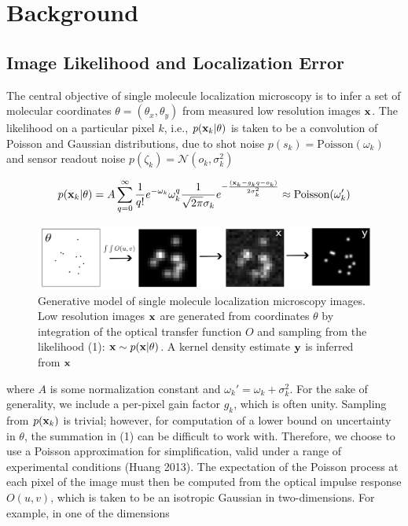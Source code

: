 \documentclass{article}
\begin{document}
\section{Background}

\subsection{Image Likelihood and Localization Error}

The central objective of single molecule localization microscopy is to infer a set of molecular coordinates $\theta=(\theta_{x},\theta_{y})$ from measured low resolution images $\bold{x}$. The likelihood on a particular pixel $k$, i.e., $p(\bold{x}_k|\theta)$ is taken to be a convolution of Poisson and Gaussian distributions, due to shot noise $p(s_{k}) = \mathrm{Poisson}(\omega_{k})$ and sensor readout noise $p(\zeta_{k}) = \mathcal{N}(o_{k},\sigma_{k}^{2})$ 

\begin{equation}
p(\bold{x}_{k}|\theta) = A\sum_{q=0}^{\infty} \frac{1}{q!}e^{-\omega_{k}}\omega_{k}^{q}\frac{1}{\sqrt{2\pi}\sigma_{k}}e^{-\frac{(\bold{x}_{k}-g_{k}q-o_{k})}{2\sigma_{k}^{2}}} \approx \mathrm{Poisson}(\omega_{k}')
\end{equation}


\begin{figure}
\includegraphics[scale=0.225]{Generation.png}
\caption{Generative model of single molecule localization microscopy images. Low resolution images $\bold{x}$ are generated from coordinates $\theta$ by integration of the optical transfer function $O$ and sampling from the likelihood (1): $\bold{x}\sim p(\bold{x}|\theta)$. A kernel density estimate $\bold{y}$ is inferred from $\bold{x}$}
\end{figure}

where $A$ is some normalization constant and $\omega_{k}' = \omega_{k} + \sigma_{k}^{2}$. For the sake of generality, we include a per-pixel gain factor $g_{k}$, which is often unity. Sampling from $p(\bold{x}_{k})$ is trivial; however, for computation of a lower bound on uncertainty in $\theta$, the summation in (1) can be difficult to work with. Therefore, we choose to use a Poisson approximation for simplification, valid under a range of experimental conditions (Huang 2013). The expectation of the Poisson process at each pixel of the image must then be computed from the optical impulse response $O(u,v)$, which is taken to be an isotropic Gaussian in two-dimensions. For example, in one of the dimensions
\end{document}
